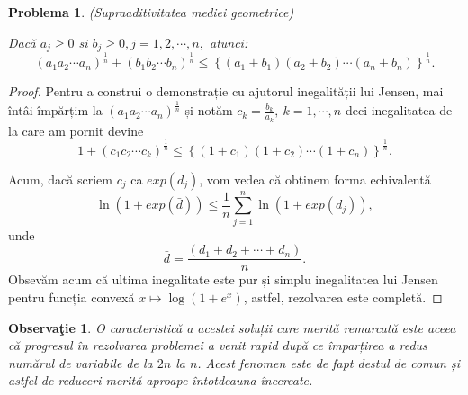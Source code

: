 \documentclass[a4paper,12pt,oneside]{report}
\newtheorem{problem}{Problema}
\newtheorem{remark}{Observa\c{t}ie}
\begin{document}
\begin{problem} (Supraaditivitatea mediei geometrice)
	
Dacă \(a_{j}\geq 0 \) si \(b_{j}\geq 0, j = 1 , 2, \cdots, n,\) atunci:
\begin{displaymath}
  \left ( a_{1}a_{2}\cdots a_{n} \right )^{\frac{1}{n}} + \left ( b_{1}b_{2}\cdots b_{n} \right )^{\frac{1}{n}} \leq  \left \{ \left ( a_{1} + b_{1}\right ) \left ( a_{2} + b_{2} \right )\cdots \left ( a_{n} + b_{n} \right )\right \}^{\frac{1}{n}}.
\end{displaymath}
\end{problem}
	\begin{proof}
	Pentru a construi o demonstrație cu ajutorul inegalității lui Jensen, mai întâi împărțim la
\(\left ( a_{1}a_{2}\cdots a_{n} \right )^{\frac{1}{n}}\) și notăm \(c_{k}=\frac{b_{k}}{a_{k}},~k=1,\cdots, n\) deci inegalitatea de la care am pornit devine
\begin{displaymath}
  1 + \left ( c_{1}c_{2} \cdots c_{k}\right )^{\frac{1}{n}}\leq \left \{ \left ( 1 + c_{1} \right )\left ( 1 + c_{2} \right )\cdots \left ( 1 + c_{n} \right ) \right \}^{\frac{1}{n}}.
\end{displaymath}

Acum, dacă scriem \(c_{j}\) ca \(exp\left (d _{j} \right )\), vom vedea că obținem forma echivalentă
\begin{displaymath}
  \ln\left ( 1 + exp\left ( \bar{d} \right ) \right ) \leq \frac{1}{n}\sum_{j = 1}^{n}\ln\left ( 1 + exp\left ( d_{j} \right ) \right ),
\end{displaymath}
unde
\begin{displaymath}
  \bar{d} = \frac{\left ( d_{1} + d_{2}  + \cdots + d_{n}\right )}{n}.
\end{displaymath}
Obsevăm acum că ultima inegalitate este pur și simplu inegalitatea lui Jensen pentru funcția convexă \(x \mapsto \log \left ( 1 + e^{x} \right )\), astfel, rezolvarea este completă.
\end{proof}
\begin{remark}
O caracteristică a acestei soluții care merită remarcată este aceea că progresul în rezolvarea problemei a venit rapid după ce împarțirea a redus numărul de variabile de la \(2n\) la \(n\). Acest fenomen este de fapt destul de comun și astfel de reduceri merită aproape întotdeauna încercate.
\end{remark}
\end{document}
